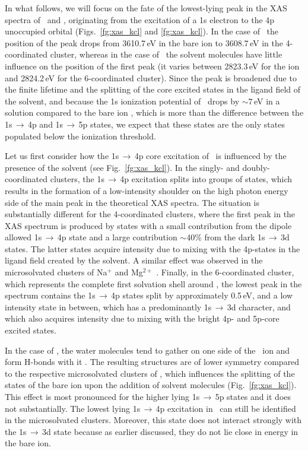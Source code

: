 
In what follows, we will focus on the fate of the lowest-lying peak in the XAS spectra of \ki~and \cli, originating from the excitation of a 1s electron to the 4p unoccupied orbital (Figs.\ \ref{fg:xas_kcl} and \ref{fg:xas_kcl}). In the case of \ki~the position of the peak drops from 3610.7\,eV in the bare ion \citep{hertlein06:062715} to 3608.7\,eV in the 4-coordinated cluster, whereas in the case of \cli~the solvent molecules have little influence on the position of the first peak (it varies between 2823.3\,eV for the ion and 2824.2\,eV for the 6-coordinated cluster). Since the peak is broadened due to the finite lifetime and the splitting of the core excited states in the ligand field of the solvent, and because the 1s ionization potential of \ki~drops by $\sim$7\,eV in a solution \citep{ceolin17} compared to the bare ion \citep{hertlein06:062715}, which is more than the difference between the 1s$\,\rightarrow\,$4p and 1s$\,\rightarrow\,$5p states, we expect that these states are the only states populated below the ionization threshold.


Let us first consider how the 1s$\,\rightarrow\,$4p core excitation of \ki~is influenced by the presence of the solvent (see Fig.\ \ref{fg:xas_kcl}). In the singly- and doubly-coordinated clusters, the 1s$\,\rightarrow\,$4p excitation splits into groups of states, which results in the formation of a low-intensity shoulder on the high photon energy side of the main peak in the theoretical XAS spectra. The situation is substantially different for the 4-coordinated clusters, where the first peak in the XAS spectrum is produced by states with a small contribution from the dipole allowed 1s$\,\rightarrow\,$4p state and a large contribution $\sim$40\% from the dark 1s$\,\rightarrow\,$3d states. The latter states acquire intensity due to mixing with the 4p-states in the ligand field created by the solvent. A similar effect was observed in the microsolvated clusters of Na$^{+}$ and Mg$^{2+}$ \citep{miteva16:16671}. Finally, in the 6-coordinated cluster, which represents the complete first solvation shell around \ki, the lowest peak in the spectrum contains the 1s$\,\rightarrow\,$4p states split by approximately 0.5\,eV, and a low intensity state in between, which has a predominantly 1s$\,\rightarrow\,$3d character, and which also acquires intensity due to mixing with the bright 4p- and 5p-core excited states.


In the case of \cli, the water molecules tend to gather on one side of the \cli~ion and form H-bonds with it \citep{ge13:13169}. The resulting structures are of lower symmetry compared to the respective microsolvated clusters of \ki, which influences the splitting of the states of the bare ion upon the addition of solvent molecules (Fig.\ \ref{fg:xas_kcl}). This effect is most pronounced for the higher lying 1s$\,\rightarrow\,$5p states and it does not substantially. The lowest lying 1s$\,\rightarrow\,$4p excitation in \cli~can still be identified in the microsolvated clusters. Moreover, this state does not interact strongly with the 1s$\,\rightarrow\,$3d state because as earlier discussed, they do not lie close in energy in the bare ion.


